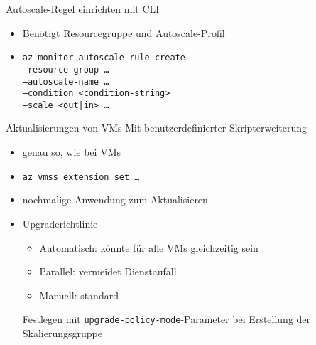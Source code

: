 \begin{flashcard}[Definition]{Autoscale-Regel einrichten mit CLI}
    \begin{itemize}
        \item Benötigt Resourcegruppe und Autoscale-Profil
        \item \texttt{az monitor autoscale rule create\\--resource-group \ldots\\--autoscale-name \ldots\\--condition <condition-string>\\--scale <out|in> \ldots}
    \end{itemize}
\end{flashcard}

\begin{flashcard}[Definition]{Aktualisierungen von VMs}
    Mit benutzerdefinierter Skripterweiterung
    \begin{itemize}
        \item genau so, wie bei VMs
        \item \texttt{az vmss extension set \ldots}
        \item nochmalige Anwendung zum Aktualisieren
        \item Upgraderichtlinie
            \begin{itemize}
                \item Automatisch: könnte für alle VMs gleichzeitig sein
                \item Parallel: vermeidet Dienstaufall
                \item Manuell: standard
            \end{itemize}
            Festlegen mit \texttt{upgrade-policy-mode}-Parameter bei Erstellung der Skalierungsgruppe
    \end{itemize}
\end{flashcard}
   
